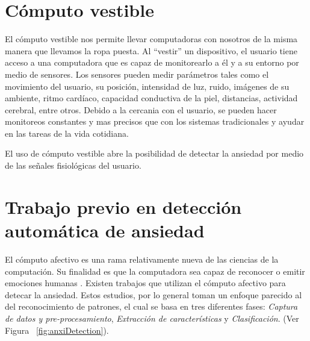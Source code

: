 \section{C\'omputo vestible}\label{secc:dementia}
El c\'omputo vestible nos permite llevar computadoras con nosotros de la misma manera que llevamos la ropa puesta. Al ``vestir'' un dispositivo, el usuario tiene acceso a una computadora que es capaz de monitorearlo a \'el y a su entorno por medio de sensores. Los sensores pueden medir par\'ametros tales como el movimiento del usuario, su posici\'on, intensidad de luz, ruido, im\'agenes de su ambiente, ritmo card\'iaco, capacidad conductiva de la piel, distancias, actividad cerebral, entre otros. Debido a la cercania con el usuario, se pueden hacer monitoreos constantes y mas precisos que con los sistemas tradicionales y ayudar en las tareas de la vida cotidiana.

El uso de c\'omputo vestible abre la posibilidad de detectar la ansiedad por medio de las se\~nales fisiol\'ogicas del usuario.

\section{Trabajo previo en detecci\'on autom\'atica de ansiedad}
El c\'omputo afectivo es una rama relativamente nueva de las ciencias de la computaci\'on. Su finalidad es que la computadora sea capaz de reconocer o emitir emociones humanas \citep{picard1997affective}. Existen trabajos que utilizan el c\'omputo afectivo para detecar la ansiedad. Estos estudios, por lo general toman un enfoque parecido al del reconocimiento de patrones, el cual se basa en tres diferentes fases: \textit{Captura de datos y pre-procesamiento}, \textit{Extracci\'on de caracter\'isticas} y \textit{Clasificaci\'on}. (Ver Figura ~\ref{fig:anxiDetection}). 

